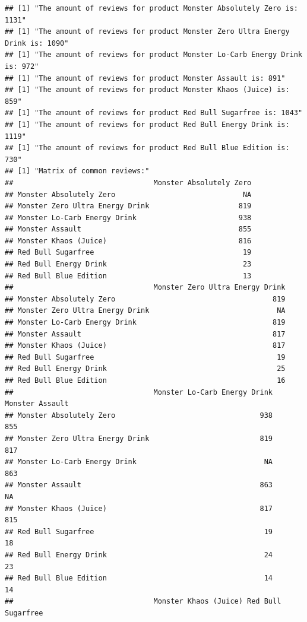 \documentclass[
]{article}
\begin{document}
\begin{verbatim}
## [1] "The amount of reviews for product Monster Absolutely Zero is: 1131"
## [1] "The amount of reviews for product Monster Zero Ultra Energy Drink is: 1090"
## [1] "The amount of reviews for product Monster Lo-Carb Energy Drink is: 972"
## [1] "The amount of reviews for product Monster Assault is: 891"
## [1] "The amount of reviews for product Monster Khaos (Juice) is: 859"
## [1] "The amount of reviews for product Red Bull Sugarfree is: 1043"
## [1] "The amount of reviews for product Red Bull Energy Drink is: 1119"
## [1] "The amount of reviews for product Red Bull Blue Edition is: 730"
## [1] "Matrix of common reviews:"
##                                 Monster Absolutely Zero
## Monster Absolutely Zero                              NA
## Monster Zero Ultra Energy Drink                     819
## Monster Lo-Carb Energy Drink                        938
## Monster Assault                                     855
## Monster Khaos (Juice)                               816
## Red Bull Sugarfree                                   19
## Red Bull Energy Drink                                23
## Red Bull Blue Edition                                13
##                                 Monster Zero Ultra Energy Drink
## Monster Absolutely Zero                                     819
## Monster Zero Ultra Energy Drink                              NA
## Monster Lo-Carb Energy Drink                                819
## Monster Assault                                             817
## Monster Khaos (Juice)                                       817
## Red Bull Sugarfree                                           19
## Red Bull Energy Drink                                        25
## Red Bull Blue Edition                                        16
##                                 Monster Lo-Carb Energy Drink Monster Assault
## Monster Absolutely Zero                                  938             855
## Monster Zero Ultra Energy Drink                          819             817
## Monster Lo-Carb Energy Drink                              NA             863
## Monster Assault                                          863              NA
## Monster Khaos (Juice)                                    817             815
## Red Bull Sugarfree                                        19              18
## Red Bull Energy Drink                                     24              23
## Red Bull Blue Edition                                     14              14
##                                 Monster Khaos (Juice) Red Bull Sugarfree

\end{verbatim}
\end{document}
